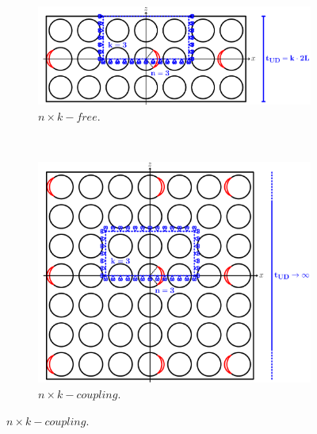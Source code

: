 \begin{figure}[!h]
\centering
    \begin{subfigure}[b]{0.475\textwidth}
        \includegraphics[width=\textwidth]{paperE/thickPlyUD.pdf}
        \caption{$n\times k-free$.}\label{paperE:fig:rves-a}
    \end{subfigure} ~
   \begin{subfigure}[b]{0.475\textwidth}
        \includegraphics[width=\textwidth]{paperE/coupling.pdf}
        \caption{$n\times k-coupling$.}\label{paperE:fig:rves-b}
    \end{subfigure}


\end{figure}
